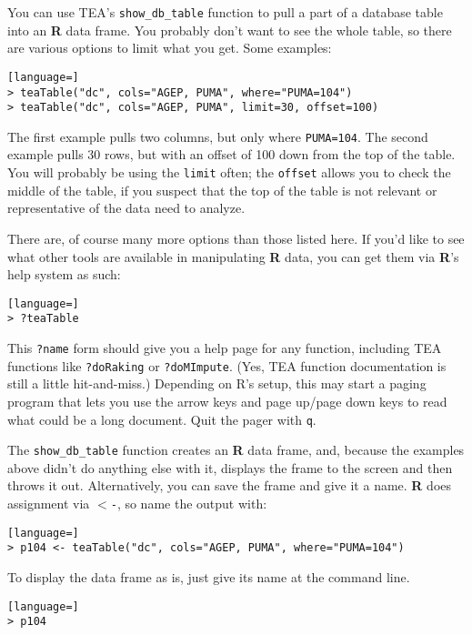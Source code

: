 \documentclass{article}
\begin{document}
You can use TEA's {\tt show\_db\_table} function to pull a part of a database table into
an \textbf{R} data frame. You probably don't want to see the whole table, so there are
various options to limit what you get. Some examples:
\begin{lstlisting}[language=]
> teaTable("dc", cols="AGEP, PUMA", where="PUMA=104")
> teaTable("dc", cols="AGEP, PUMA", limit=30, offset=100)
\end{lstlisting}

The first example pulls two columns, but only where {\tt PUMA=104}. The second
example pulls 30 rows, but with an offset of 100 down from the top of the
table. You will probably be using the {\tt limit} often; the {\tt offset} allows
you to check the middle of the table, if you suspect that the top of the table
is not relevant or representative of the data need to analyze.

There are, of course many more options than those listed here. If you'd like to see what other tools are available in manipulating \textbf{R} data, you can get them via \textbf{R}'s help system as such:
\begin{lstlisting}[language=]
> ?teaTable
\end{lstlisting}

This {\tt ?name} form should give you a help page for any function, including TEA
functions like {\tt ?doRaking} or {\tt ?doMImpute}. (Yes, TEA function documentation is still a
little hit-and-miss.) Depending on R's setup, this may start a paging program that lets 
you use the arrow keys and page up/page down keys to read what could be a long document. 
Quit the pager with {\tt q}.

The {\tt show\_db\_table} function creates an \textbf{R} data frame, and, because the examples above didn't do
anything else with it, displays the frame to the screen and then throws it out. Alternatively, you can
save the frame and give it a name. \textbf{R} does assignment via {\tt $<$-}, so name the output
with:

\begin{lstlisting}[language=]
> p104 <- teaTable("dc", cols="AGEP, PUMA", where="PUMA=104")
\end{lstlisting}

To display the data frame as is, just give its name at the command line.

\begin{lstlisting}[language=]
> p104
\end{lstlisting}
\end{document}
